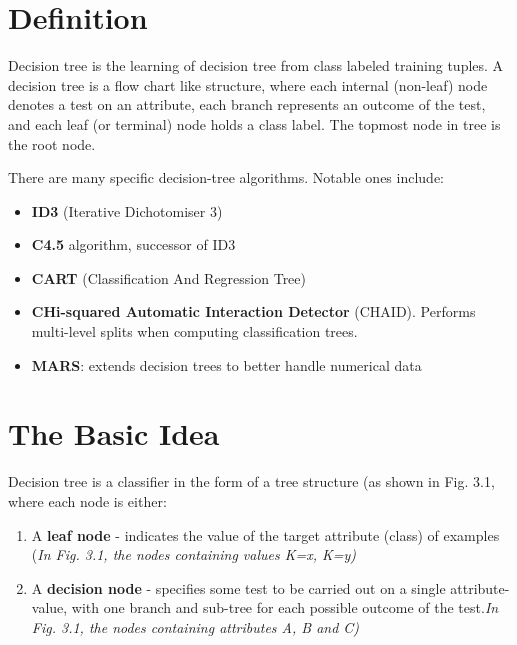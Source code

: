 \documentclass[12pt]{report}
\begin{document}
\section{Definition}


Decision tree is the learning of decision tree from class labeled training tuples. A decision tree is a flow chart like structure, where each internal (non-leaf) node denotes a test on an attribute, each branch represents an outcome of the test, and each leaf (or terminal) node holds a class label. The topmost node in tree is the root node.

There are many specific decision-tree algorithms. Notable ones include:

\begin{itemize}
\item{\textbf{ID3} (Iterative Dichotomiser 3)}
\item{\textbf{C4.5} algorithm, successor of ID3}
\item{\textbf{CART} (Classification And Regression Tree)}
\item{\textbf{CHi-squared Automatic Interaction Detector }(CHAID). Performs multi-level splits when computing classification trees.}
\item{\textbf{MARS}: extends decision trees to better handle numerical data}
\end{itemize}


\section{The Basic Idea}

Decision tree is a classifier in the form of a tree structure (as shown in Fig. 3.1, where each node is either:
\begin{enumerate}
\item{A \textbf{leaf node} - indicates the value of the target attribute (class) of examples} (\textit{In Fig. 3.1, the nodes containing values K=x, K=y)}
\item{A \textbf{decision node} - specifies some test to be carried out on a single attribute-value, with one branch and sub-tree for each possible outcome of the test.\textit{In Fig. 3.1, the nodes containing attributes A, B and C)}}

\end{enumerate}
\end{document}
